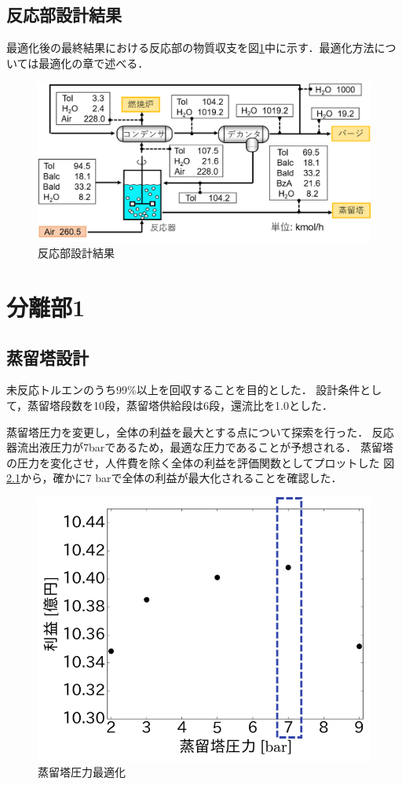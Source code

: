 \documentclass[a4j]{jsreport}
\begin{document}
\section{反応部設計結果}
最適化後の最終結果における反応部の物質収支を図\ref{反応部設計結果の図}中に示す．最適化方法については最適化の章で述べる．
\begin{figure}[htbp]
  \centering
  \includegraphics[scale=0.7]{ReactionSectionConclusion.png}
  \caption{反応部設計結果}
  \label{反応部設計結果の図}
\end{figure}


\newpage
\chapter{分離部1}
\section{蒸留塔設計}
未反応トルエンのうち99\%以上を回収することを目的とした．
設計条件として，蒸留塔段数を10段，蒸留塔供給段は6段，還流比を1.0とした．

蒸留塔圧力を変更し，全体の利益を最大とする点について探索を行った．
反応器流出液圧力が7barであるため，最適な圧力であることが予想される．
蒸留塔の圧力を変化させ，人件費を除く全体の利益を評価関数としてプロットした
図\ref{蒸留塔圧力最適化}から，確かに7 \si{\bar}で全体の利益が最大化されることを確認した．
\begin{figure}[htbp]
  \centering
  \includegraphics[scale=0.7]{DistillationPressue.png}
  \caption{蒸留塔圧力最適化}
  \label{蒸留塔圧力最適化}
\end{figure}
\end{document}
